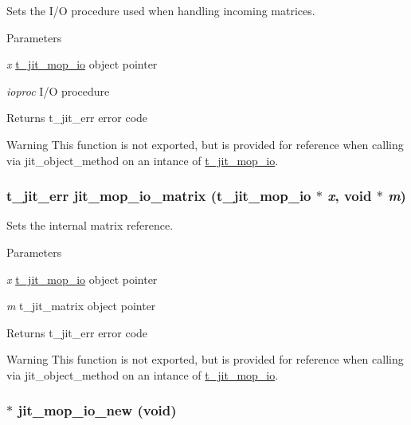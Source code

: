 Sets the I/O procedure used when handling incoming matrices. 
\begin{DoxyParams}{Parameters}
\item[{\em x}]\hyperlink{structt__jit__mop__io}{t\_\-jit\_\-mop\_\-io} object pointer \item[{\em ioproc}]I/O procedure\end{DoxyParams}
\begin{DoxyReturn}{Returns}
t\_\-jit\_\-err error code
\end{DoxyReturn}
\begin{DoxyWarning}{Warning}
This function is not exported, but is provided for reference when calling via jit\_\-object\_\-method on an intance of \hyperlink{structt__jit__mop__io}{t\_\-jit\_\-mop\_\-io}. 
\end{DoxyWarning}
\hypertarget{group__mopmod_gaebb33ac5825a27e42c476faf8724d6de}{
\subsubsection[{jit\_\-mop\_\-io\_\-matrix}]{\setlength{\rightskip}{0pt plus 5cm}t\_\-jit\_\-err jit\_\-mop\_\-io\_\-matrix ({\bf t\_\-jit\_\-mop\_\-io} $\ast$ {\em x}, \/  void $\ast$ {\em m})}}
\label{group__mopmod_gaebb33ac5825a27e42c476faf8724d6de}


Sets the internal matrix reference. 
\begin{DoxyParams}{Parameters}
\item[{\em x}]\hyperlink{structt__jit__mop__io}{t\_\-jit\_\-mop\_\-io} object pointer \item[{\em m}]t\_\-jit\_\-matrix object pointer\end{DoxyParams}
\begin{DoxyReturn}{Returns}
t\_\-jit\_\-err error code
\end{DoxyReturn}
\begin{DoxyWarning}{Warning}
This function is not exported, but is provided for reference when calling via jit\_\-object\_\-method on an intance of \hyperlink{structt__jit__mop__io}{t\_\-jit\_\-mop\_\-io}. 
\end{DoxyWarning}
\hypertarget{group__mopmod_gade67016225c12a230ee31e0d78f838b2}{
\subsubsection[{jit\_\-mop\_\-io\_\-new}]{ $\ast$ jit\_\-mop\_\-io\_\-new (void)}}
\label{group__mopmod_gade67016225c12a230ee31e0d78f838b2}


